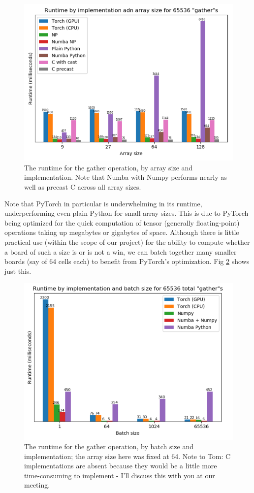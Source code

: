 \documentclass[english, 11pt]{article}
\begin{document}
\begin{figure}[!h]
	\centering
	\includegraphics[scale=1]{./img/unbatched_full.png}
	\caption{The runtime for the gather operation, by array size and implementation. Note that Numba with Numpy performs nearly as well as precast C across all array sizes.} \label{fig:unbatched}
\end{figure}

Note that PyTorch in particular is underwhelming in its runtime, underperforming even plain Python for small array sizes. This is due to PyTorch being optimized for the quick computation of tensor (generally floating-point) operations taking up megabytes or gigabytes of space. Although there is little practical use (within the scope of our project) for the ability to compute whether a board of such a size is or is not a win, we can batch together many smaller boards (say of 64 cells each) to benefit from PyTorch's optimization. Fig \ref{fig:batched} shows just this.

\begin{figure}[!h]
	\centering
	\includegraphics[scale=1]{./img/batched_full.png}
	\caption{The runtime for the gather operation, by batch size and implementation; the array size here was fixed at 64. Note to Tom: C implementations are absent because they would be a little more time-consuming to implement - I'll discuss this with you at our meeting.} \label{fig:batched}
\end{figure}
\end{document}
